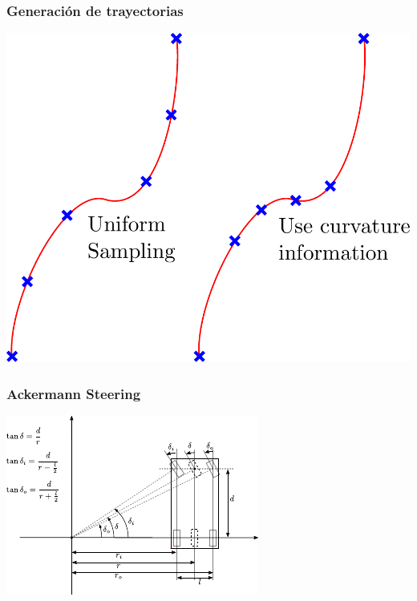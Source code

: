 \begin{frame}
    \frametitle{Generación de trayectorias}
    
    \begin{center}
        \includegraphics[width=0.6\columnwidth]{images/trajectory_generation.pdf}
    \end{center}
    
\end{frame}

\begin{frame}
    \frametitle{Ackermann Steering}
    
    \begin{center}
        \includegraphics[width=0.6\columnwidth]{images/ackermann_steering.pdf}
    \end{center}
    
\end{frame}

